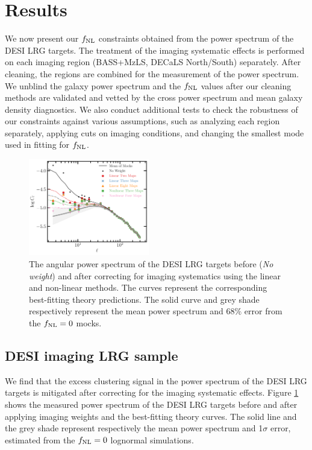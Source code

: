 \section{Results}\label{sec:results}
We now present our $f_{\rm NL}$ constraints obtained from the power spectrum of the DESI LRG targets. The treatment of the imaging systematic effects is performed on each imaging region (BASS+MzLS, DECaLS North/South) separately. After cleaning, the regions are combined for the measurement of the power spectrum. We unblind the galaxy power spectrum and the $f_{\rm NL}$ values after our cleaning methods are validated and vetted by the cross power spectrum and mean galaxy density diagnostics. We also conduct additional tests to check the robustness of our constraints against various assumptions, such as analyzing each region separately, applying cuts on imaging conditions, and changing the smallest mode used in fitting for $f_{\rm NL}$.


\begin{figure}
    \centering
    \includegraphics[width=0.47\textwidth]{figures/model_dr9.pdf} 
    \caption{The angular power spectrum of the DESI LRG targets before (\textit{No weight}) and after correcting for imaging systematics using the linear and non-linear methods. The curves represent the corresponding best-fitting theory predictions. The solid curve and grey shade respectively represent the mean power spectrum and $68\%$ error from the $f_{\rm NL}=0$ mocks.}
    \label{fig:cl_dr9}
\end{figure}


\subsection{DESI imaging LRG sample}
We find that the excess clustering signal in the power spectrum of the DESI LRG targets is mitigated after correcting for the imaging systematic effects. Figure \ref{fig:cl_dr9} shows the measured power spectrum of the DESI LRG targets before and after applying imaging weights and the best-fitting theory curves. The solid line and the grey shade represent respectively the mean power spectrum and 1$\sigma$ error, estimated from the $f_{\rm NL}=0$ lognormal simulations. 




